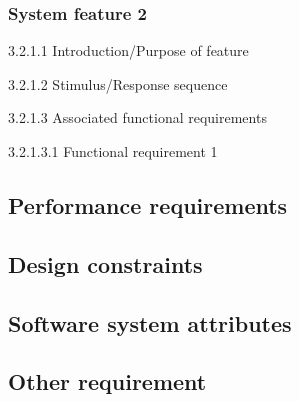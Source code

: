 \documentclass{journal}
\begin{document}
\subsubsection{System feature 2}
\begin{description}

\item{3.2.1.1} Introduction/Purpose of feature
\item{3.2.1.2} Stimulus/Response sequence
\item{3.2.1.3} Associated functional requirements
\begin{description}
\item{3.2.1.3.1} Functional requirement 1
\end{description}
\end{description}

\subsection{Performance requirements}
\subsection{Design constraints}
\subsection{Software system attributes}
\subsection{Other requirement}

\newpage

\end{document}
